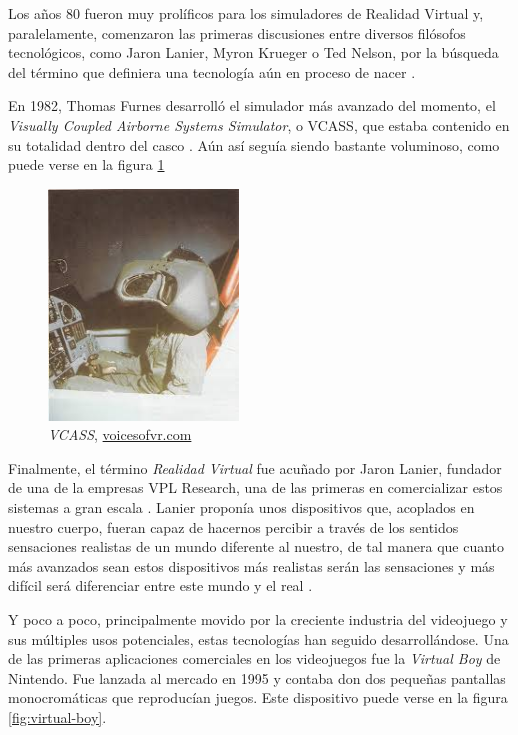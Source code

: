 Los años 80 fueron muy prolíficos para los simuladores de Realidad Virtual y, paralelamente, comenzaron las primeras discusiones entre diversos filósofos tecnológicos, como Jaron Lanier, Myron Krueger o Ted Nelson, por la búsqueda del término que definiera una tecnología aún en proceso de nacer \cite{lop-18}.

En 1982, Thomas Furnes desarrolló el simulador más avanzado del momento, el \textit{Visually Coupled Airborne Systems Simulator}, o VCASS, que estaba contenido en su totalidad dentro del casco \cite{cade-08}. Aún así seguía siendo bastante voluminoso, como puede verse en la figura \ref{fig:VCASS} 

\begin{figure}[H]
    \begin{center}
        \includegraphics[width=0.45\textwidth]{imagenes/2/VCASS.jpg}
        \caption{\textit{VCASS}, \url{voicesofvr.com}}
        \label{fig:VCASS}
    \end{center}
\end{figure}

Finalmente, el término \textit{Realidad Virtual} fue acuñado por Jaron Lanier, fundador de una de la empresas VPL Research, una de las primeras en comercializar estos sistemas a gran escala \cite{fer-02}. Lanier proponía unos dispositivos que, acoplados en nuestro cuerpo, fueran capaz de hacernos percibir a través de los sentidos sensaciones realistas de un mundo diferente al nuestro, de tal manera que cuanto más avanzados sean estos dispositivos más realistas serán las sensaciones y más difícil será diferenciar entre este mundo y el real \cite{lop-18}.

Y poco a poco, principalmente movido por la creciente industria del videojuego y sus múltiples usos potenciales, estas tecnologías han seguido desarrollándose. Una de las primeras aplicaciones comerciales en los videojuegos fue la \textit{Virtual Boy} de Nintendo. Fue lanzada al mercado en 1995 y contaba don dos pequeñas pantallas monocromáticas que reproducían juegos. Este dispositivo puede verse en la figura \ref{fig:virtual-boy}.

